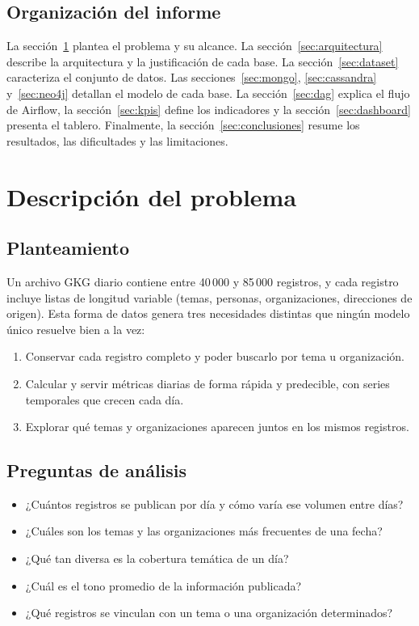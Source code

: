 \documentclass[11pt,a4paper]{article}
\begin{document}
\subsection{Organización del informe}

La sección~\ref{sec:problema} plantea el problema y su alcance. La sección~\ref{sec:arquitectura} describe la arquitectura y la justificación de cada base. La sección~\ref{sec:dataset} caracteriza el conjunto de datos. Las secciones~\ref{sec:mongo}, \ref{sec:cassandra} y~\ref{sec:neo4j} detallan el modelo de cada base. La sección~\ref{sec:dag} explica el flujo de Airflow, la sección~\ref{sec:kpis} define los indicadores y la sección~\ref{sec:dashboard} presenta el tablero. Finalmente, la sección~\ref{sec:conclusiones} resume los resultados, las dificultades y las limitaciones.

\section{Descripción del problema}\label{sec:problema}

\subsection{Planteamiento}

Un archivo GKG diario contiene entre 40\,000 y 85\,000 registros, y cada registro incluye listas de longitud variable (temas, personas, organizaciones, direcciones de origen). Esta forma de datos genera tres necesidades distintas que ningún modelo único resuelve bien a la vez:

\begin{enumerate}
    \item Conservar cada registro completo y poder buscarlo por tema u organización.
    \item Calcular y servir métricas diarias de forma rápida y predecible, con series temporales que crecen cada día.
    \item Explorar qué temas y organizaciones aparecen juntos en los mismos registros.
\end{enumerate}

\subsection{Preguntas de análisis}

\begin{itemize}
    \item ¿Cuántos registros se publican por día y cómo varía ese volumen entre días?
    \item ¿Cuáles son los temas y las organizaciones más frecuentes de una fecha?
    \item ¿Qué tan diversa es la cobertura temática de un día?
    \item ¿Cuál es el tono promedio de la información publicada?
    \item ¿Qué registros se vinculan con un tema o una organización determinados?
\end{itemize}
\end{document}
